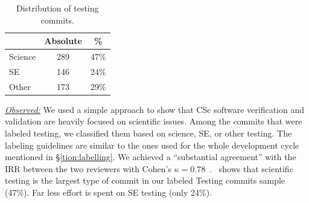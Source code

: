 \documentclass[conference,10pt]{IEEEtran}
\begin{document}
\begin{table}
\vspace{-10pt}
\caption{Distribution of testing  commits.}\label{tbl:testing}
\vspace{-5pt}
\footnotesize \begin{tabular}{l|c|c}
\multicolumn{1}{c|}{} & \multicolumn{1}{c|}{Absolute} & \multicolumn{1}{c}{\%}\\
\hline
Science & 289 & 47\% \\
SE & 146 & 24\% \\
Other & 173 & 29\% 
\end{tabular}
\vspace{-10pt}
\end{table}\noindent \textit{\underline{Observed:}}
We used a simple approach to show that CSc software verification and validation are heavily focused on scientific issues. Among the commits that were labeled testing, we classified them based on science, SE, or other testing. The labeling guidelines are similar to the ones used for the whole development cycle mentioned in \S\ref{tion:labelling}. We achieved a ``substantial agreement'' with the IRR between the two reviewers with Cohen's 
\mbox{$\kappa = 0.78$~\cite{irr_kappa}}.~ shows that scientific testing is the largest type of commit in our labeled Testing commits sample (47\%). 
Far less effort is spent on SE testing (only 24\%). 
\end{document}
